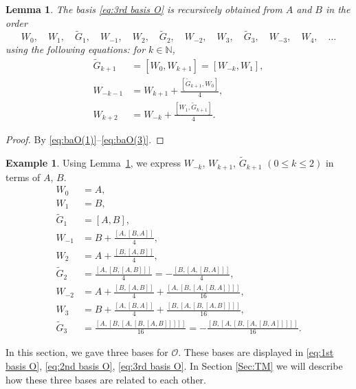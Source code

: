 \documentclass[11pt]{article}%
\theoremstyle{definition}
\newtheorem{example}[definition]{Example}
\theoremstyle{plain}
\newtheorem{lemma}[definition]{Lemma}
\begin{document}
\begin{lemma}\label{lem:3rd-rec}
The basis \eqref{eq:3rd basis O} is recursively obtained from $A$ and $B$ in the order
$$
	W_0, \quad W_1, \quad 
	\tilde{G}_1, \quad W_{-1}, \quad W_2, 
	\quad \tilde{G}_2, \quad W_{-2}, \quad W_3, 
	\quad \tilde{G}_3, \quad W_{-3}, \quad W_4,  \quad \ldots
$$
using the following equations: for $k \in \mathbb{N}$,
\begin{align*}
	\tilde{G}_{k+1} & = [W_0, W_{k+1}] = [W_{-k}, W_1], \\[2pt]
	W_{-k-1} & = W_{k+1} + \frac{[\tilde{G}_{k+1}, W_0]}{4}, \\[2pt]
	W_{k+2} & = W_{-k} + \frac{[W_1, \tilde{G}_{k+1}]}{4}.
\end{align*}
\end{lemma}
\begin{proof}
By \eqref{eq:baO(1)}--\eqref{eq:baO(3)}.
\end{proof}

\begin{example}
Using Lemma~\ref{lem:3rd-rec}, we express $W_{-k}$, $W_{k+1}$, $\tilde{G}_{k+1}$ $(0 \leq k \leq 2)$ in terms of $A$, $B$.
\begin{align*}
	W_0 & = A, \\[2pt]
	W_{1} & = B, \\[2pt]
	\tilde{G}_1 & = [A, B], \\[2pt]
	W_{-1} & = B + \frac{[A, [B, A]]}{4}, \\[2pt]
	W_2 & = A + \frac{[B, [A, B]]}{4}, \\[2pt]
	\tilde{G}_2 & = \frac{[A, [B, [A, B]]]}{4}  = - \frac{[B, [A, [B, A]]]}{4}, \\[2pt]
	W_{-2} & = A + \frac{[B, [A, B]]}{4}  + \frac{[A, [B, [A, [B, A]]]]}{16} , \\[2pt]
	W_3 & = B + \frac{[A, [B, A]]}{4}  + \frac{[B, [A, [B, [A, B]]]]}{16} , \\[2pt]
	\tilde{G}_3 & = \frac{[A, [B, [A, [B, [A, B]]]]]}{16}  = - \frac{[B, [A, [B, [A, [B, A]]]]]}{16}.
\end{align*}
\end{example}


In this section, we gave three bases for $\mathcal{O}$.
These bases are displayed in \eqref{eq:1st basis O}, \eqref{eq:2nd basis O}, \eqref{eq:3rd basis O}.
In Section \ref{Sec:TM} we will describe how these three bases are related to each other.


\end{document}
